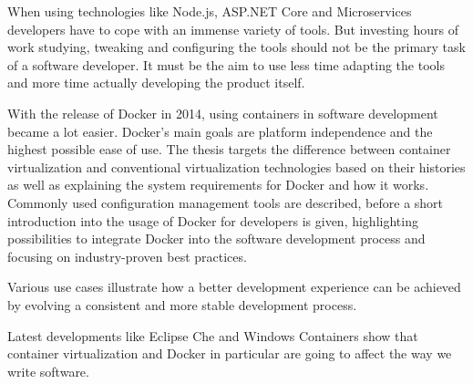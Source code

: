 When using technologies like Node.js, ASP.NET Core and Microservices developers have to cope with an immense variety of tools.
But investing hours of work studying, tweaking and configuring the tools should not be the primary task of a software developer.
It must be the aim to use less time adapting the tools and more time actually developing the product itself.

With the release of Docker in 2014, using containers in software development became a lot easier.
Docker's main goals are platform independence and the highest possible ease of use.
The thesis targets the difference between container virtualization and conventional virtualization technologies based on their histories as well as explaining the system requirements for Docker and how it works.
Commonly used configuration management tools are described, before a short introduction into the usage of Docker for developers is given, highlighting possibilities to integrate Docker into the software development process and focusing on industry-proven best practices.

Various use cases illustrate how a better development experience can be achieved by evolving a consistent and more stable development process.

Latest developments like Eclipse Che and Windows Containers show that container virtualization and Docker in particular are going to affect the way we write software.
